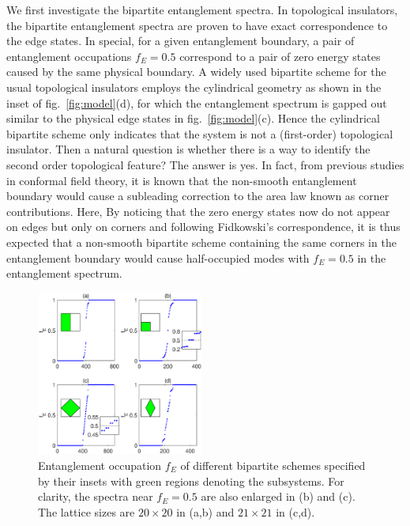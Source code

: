 \documentclass[doublecol]{epl2} %
\begin{document}
We first investigate the bipartite entanglement spectra. In topological insulators, the bipartite entanglement spectra are proven to have exact correspondence to the edge states. \cite{Fidkowski_PRL_2010} In special, for a given entanglement boundary, a pair of entanglement occupations $f_{E}=0.5$ correspond to a pair of zero energy states caused by the same physical boundary. A widely used bipartite scheme for the usual topological insulators employs the cylindrical geometry as shown in the inset of fig.~\ref{fig:model}(d), for which the entanglement spectrum is gapped out similar to the physical edge states in fig.~\ref{fig:model}(c). Hence the cylindrical bipartite scheme only indicates that the system is not a (first-order) topological insulator. Then a natural question is whether there is a way to identify the second order topological feature? The answer is yes. In fact, from previous studies in conformal field theory, it is known that the non-smooth entanglement boundary would cause a subleading correction to the area law known as corner contributions. \cite{Laflorencie_PR_2016} Here, By noticing that the zero energy states now do not appear on edges but only on corners and following Fidkowski's correspondence, it is thus expected that a non-smooth bipartite scheme containing the same corners in the entanglement boundary would cause half-occupied modes with $f_E=0.5$ in the entanglement spectrum.

\begin{figure}
    \includegraphics[width=0.49\textwidth]{subshape.eps}
    \caption{\label{fig:subshape} Entanglement occupation $f_E$ of different bipartite schemes specified by their insets with green regions denoting the subsystems. For clarity, the spectra near $f_E=0.5$ are also enlarged in (b) and (c). The lattice sizes are $20\times20$ in (a,b) and $21\times21$ in (c,d).}
\end{figure}
\end{document}
